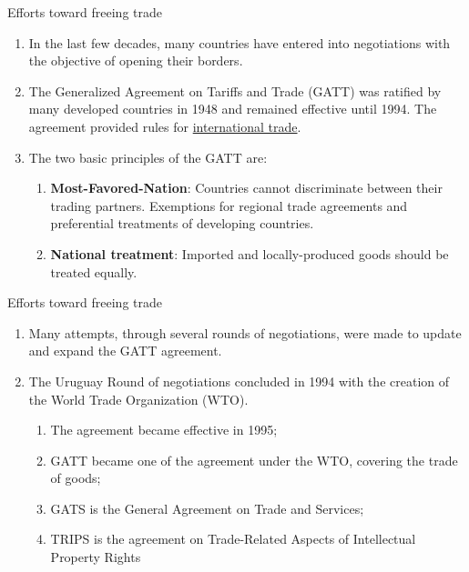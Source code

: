 \documentclass[table,xcolor=pdftex,dvipsnames]{beamer}\usepackage[]{graphicx}\usepackage[]{color}
\begin{document}
\begin{frame}{Efforts toward freeing trade}
\begin{enumerate}[label=\textbullet]
    \item In the last few decades, many countries have entered into negotiations with the objective of opening their borders.
    \item The Generalized Agreement on Tariffs and Trade (GATT) was ratified by many developed countries in 1948 and remained effective until 1994. The agreement provided rules for \href{http://www.wto.org/english/thewto_e/whatis_e/tif_e/fact4_e.htm}{international trade}.
    \item The two basic principles of the GATT are:
      \begin{enumerate}[label=-]
        \item \textbf{Most-Favored-Nation}: Countries cannot discriminate between their trading partners. Exemptions for regional trade agreements and preferential treatments of developing countries.
        \item \textbf{National treatment}: Imported and locally-produced goods should be treated equally.
      \end{enumerate}
\end{enumerate}
\end{frame}


\begin{frame}{Efforts toward freeing trade}
\begin{enumerate}[label=\textbullet]
    \item Many attempts, through several rounds of negotiations, were made to update and expand the GATT agreement.
    \item The Uruguay Round of negotiations concluded in 1994 with the creation of the World Trade Organization (WTO).
      \begin{enumerate}[label=-]
        \item The agreement became effective in 1995;
        \item GATT became one of the agreement under the WTO, covering the trade of goods;
        \item GATS is the General Agreement on Trade and Services;
        \item TRIPS is the agreement on Trade-Related Aspects of Intellectual Property Rights
      \end{enumerate}
\end{enumerate}
\end{frame}
\end{document}
